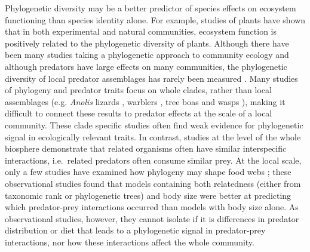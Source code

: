 Phylogenetic diversity may be a better predictor of species effects on ecosystem functioning than species identity alone. For example, studies of
plants have shown that in both experimental \citep{Cadotte2008} and
natural communities, ecosystem function is
positively related to the phylogenetic diversity of plants. Although
there have been many studies taking a phylogenetic approach to community
ecology and although predators have large effects on many communities,
the phylogenetic diversity of local predator assemblages has rarely been
measured \citep{Bersier2008, Naisbit2011}. Many studies of phylogeny and
predator traits focus on whole clades, rather than local assemblages
(e.g. \emph{Anolis} lizards \citep{Knouft2006}, warblers
\citep{Bohning-Gaese2003}, tree boas \citep{Henderson2013} and wasps
\citep{Udriene2005}), making it difficult to connect these results to
predator effects at the scale of a local community. These clade specific
studies often find weak evidence for phylogenetic signal in ecologically
relevant traits. In contrast, studies at the level of the whole
biosphere \citep{Gomez2010, Bersier2008} demonstrate that related
organisms often have similar interspecific interactions, i.e.~related
predators often consume similar prey. At the local scale, only a few
studies have examined how phylogeny may shape food webs
\citep{Rezende2009, Cagnolo2011}; these observational studies found that
models containing both relatedness (either from taxonomic rank or
phylogenetic trees) and body size were better at predicting which
predator-prey interactions occurred than models with body size alone. As
observational studies, however, they cannot isolate if it is differences
in predator distribution or diet that leads to a phylogenetic signal in
predator-prey interactions, nor how these interactions affect the whole
community.

